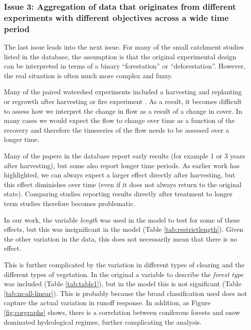 \documentclass[]{elsarticle} %
\begin{document}
\hypertarget{issue-3-aggregation-of-data-that-originates-from-different-experiments-with-different-objectives-across-a-wide-time-period}{%
\subsubsection{Issue 3: Aggregation of data that originates from different experiments with different objectives across a wide time period}\label{issue-3-aggregation-of-data-that-originates-from-different-experiments-with-different-objectives-across-a-wide-time-period}}

The last issue leads into the next issue. For many of the small catchment studies listed in the database, the assumption is that the original experimental design can be interpreted in terms of a binary ``forestation'' or ``deforestation''. However, the real situation is often much more complex and fuzzy.

Many of the paired watershed experiments included a harvesting and replanting or regrowth after harvesting or fire experiment \citep[e.g.][]{cornish1993, cornish2001, webb2013}. As a result, it becomes difficult to assess how we interpret the change in flow as a result of a change in cover. In many cases we would expect the flow to change over time as a function of the recovery \citep{jones2017} and therefore the timeseries of the flow needs to be assessed over a longer time.

Many of the papers in the database report early results (for example 1 or 3 years after harvesting), but some also report longer time periods. As earlier work \citep{cornish2001, jones2017} has highlighted, we can always expect a larger effect directly after harvesting, but this effect diminishes over time (even if it does not always return to the original state). Comparing studies reporting results directly after treatment to longer term studies therefore becomes problematic.

In our work, the variable \emph{length} was used in the model to test for some of these effects, but this was insignificant in the model (Table \ref{tab:restrictlength}). Given the other variation in the data, this does not necessarily mean that there is no effect.

This is further complicated by the variation in different types of clearing and the different types of vegetation. In the original \citet{zhang2017} a variable to describe the \emph{forest type} was included (Table \ref{tab:table1}), but in the model this is not significant (Table \ref{tab:m-all-linear}). This is probably because the broad classification used does not capture the actual variation in runoff response. In addition, as Figure \ref{fig:corgraphs} shows, there is a correlation between coniferous forests and snow dominated hydrological regimes, further complicating the analysis.
\end{document}
